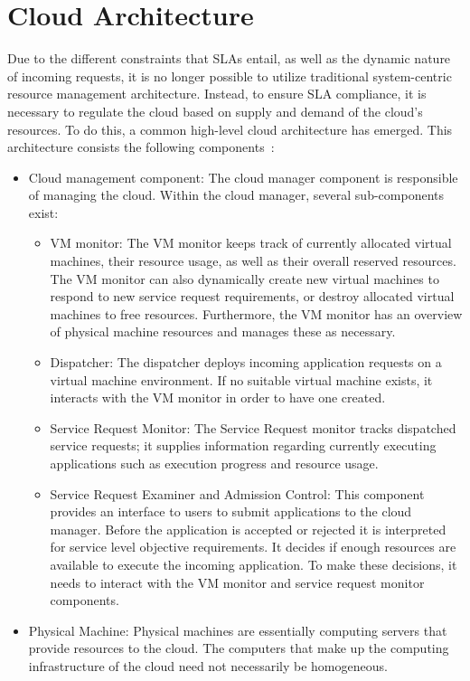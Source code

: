 \documentclass[a4paper]{llncs}
\begin{document}
\section{Cloud Architecture}
Due to the different constraints that SLAs entail, as well as the dynamic nature of incoming requests, it is no longer possible to utilize traditional system-centric resource management architecture. Instead, to ensure SLA compliance, it is necessary to regulate the cloud based on supply and demand of the cloud’s resources. To do this, a common high-level cloud architecture has emerged. This architecture consists the following components~\cite{Buyya09}:
\begin{itemize}
	\item Cloud management component: The cloud manager component is responsible of managing the cloud. Within the cloud manager, several  sub-components exist:
	\begin{itemize}
		\item VM monitor: The VM monitor keeps track of currently allocated virtual machines, their resource usage, as well as their overall reserved resources. The VM monitor can also dynamically create new virtual machines to respond to new service request requirements, or destroy allocated virtual machines to free resources. Furthermore, the VM monitor has an overview of physical machine resources and manages these as necessary.
		\item Dispatcher: The dispatcher deploys incoming application requests on a virtual machine environment. If no suitable virtual machine exists, it interacts with the VM monitor in order to have one created.
		\item Service Request Monitor: The Service Request monitor tracks dispatched service requests; it supplies information regarding currently executing applications such as execution progress and resource usage.
		\item Service Request Examiner and Admission Control: This component provides an interface to users to submit applications to the cloud manager. Before the application is accepted or rejected it is interpreted for service level objective requirements. It decides if enough resources are available to execute the incoming application. To make these decisions, it needs to interact with the VM monitor and service request monitor components.
		\end{itemize}
	\item Physical Machine: Physical machines are essentially computing servers that provide resources to the cloud. The computers that make up the computing infrastructure of the cloud need not necessarily be homogeneous.

\end{itemize}
\end{document}
